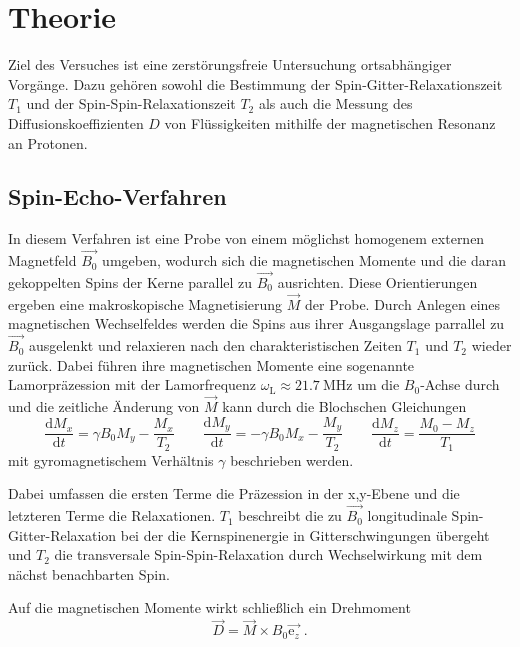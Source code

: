 
\section{Theorie}
\label{sec:Theorie}

Ziel des Versuches ist eine zerstörungsfreie Untersuchung ortsabhängiger Vorgänge. Dazu gehören sowohl die Bestimmung der 
Spin-Gitter-Relaxationszeit $T_1$ und der Spin-Spin-Relaxationszeit $T_2$ als auch die Messung des Diffusionskoeffizienten $D$
von Flüssigkeiten mithilfe der magnetischen Resonanz an Protonen.

\subsection{Spin-Echo-Verfahren}

In diesem Verfahren ist eine Probe von einem möglichst homogenem externen Magnetfeld $\vec{B_0}$ umgeben, wodurch sich die 
magnetischen Momente und die daran gekoppelten Spins der Kerne parallel zu $\vec{B_0}$ ausrichten. 
Diese Orientierungen ergeben eine makroskopische Magnetisierung
$\vec{M}$ der Probe. Durch Anlegen eines magnetischen Wechselfeldes werden die Spins aus ihrer Ausgangslage
parrallel zu $\vec{B_0}$ ausgelenkt und relaxieren nach den charakteristischen Zeiten $T_1$ und $T_2$ wieder zurück.
Dabei führen ihre magnetischen Momente eine sogenannte Lamorpräzession mit der Lamorfrequenz 
$\omega_\text{L} \approx \SI{21.7}{\mega\hertz}$ um die $B_0$-Achse durch und die zeitliche
Änderung von $\vec{M}$ kann durch die Blochschen Gleichungen
\begin{equation}
    \frac{\text{d}M_x}{\text{d}t} = \gamma B_0 M_y - \frac{M_x}{T_2} \qquad 
    \frac{\text{d}M_y}{\text{d}t} = - \gamma B_0 M_x - \frac{M_y}{T_2} \qquad
    \frac{\text{d}M_z}{\text{d}t} = \frac{M_0 - M_z}{T_1}
\end{equation}
mit gyromagnetischem Verhältnis $\gamma$ beschrieben werden.

Dabei umfassen die ersten Terme die Präzession in der x,y-Ebene und die letzteren Terme die Relaxationen.
$T_1$ beschreibt die zu $\vec{B_0}$ longitudinale Spin-Gitter-Relaxation bei der die Kernspinenergie in Gitterschwingungen übergeht
und $T_2$ die transversale Spin-Spin-Relaxation durch Wechselwirkung mit dem nächst benachbarten Spin.

Auf die magnetischen Momente wirkt schließlich ein Drehmoment
\begin{equation}
    \vec{D} = \vec{M} \times B_0 \vec{\text{e}_z} \; .
\end{equation} 

